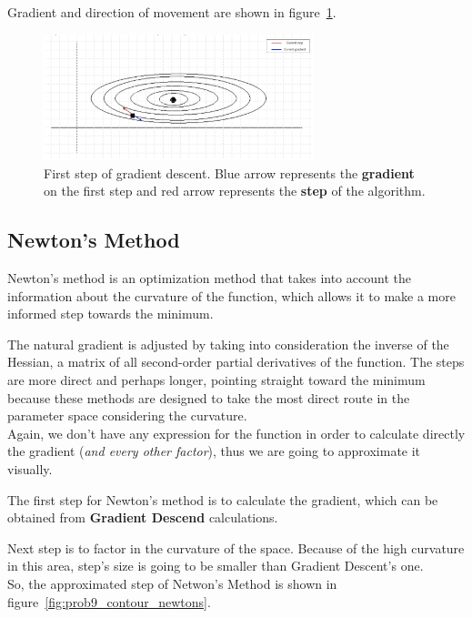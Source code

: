 Gradient and direction of movement are shown in figure~\ref{fig:prob9_contour_gd}.

\begin{figure}[htpb]
	\centering
	\includegraphics[width=0.7\textwidth]{../Problem 9/contour_gd.png}
	\caption{First step of gradient descent. Blue arrow represents the \textbf{gradient} on the first step and red arrow represents the \textbf{step} of the algorithm.}
	\label{fig:prob9_contour_gd}
\end{figure}


\subsection{Newton's Method}

Newton's method is an optimization method that takes into account the information about the curvature of the function, which allows it to make a more informed step towards the minimum.

The natural gradient is adjusted by taking into consideration the inverse of the Hessian, a matrix of all second-order partial derivatives of the function. 
The steps are more direct and perhaps longer, pointing straight toward the minimum because these methods are designed to take the most direct route in the parameter space considering the curvature.\\

Again, we don't have any expression for the function in order to calculate directly the gradient (\textit{and every other factor}), thus we are going to approximate it visually.

The first step for Newton's method is to calculate the gradient, which can be obtained from \textbf{Gradient Descend} calculations.

Next step is to factor in the curvature of the space. Because of the high curvature in this area, step's size is going to be smaller than Gradient Descent's one.\\

So, the approximated step of Netwon's Method is shown in figure~\ref{fig:prob9_contour_newtons}.

